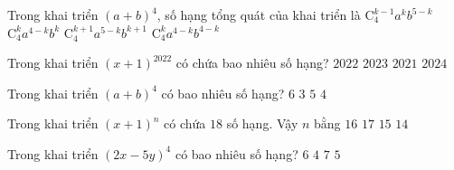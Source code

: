 

\begin{ex}%
	Trong khai triển $(a+b)^4$, số hạng tổng quát  của khai triển là
	\choice 
		 {$\mathrm{C}_{4}^{k-1} a^k b^{5-k}$}
		{\True $\mathrm{C}_{4}^k a^{4-k} b^k$} 
		{$\mathrm{C}_{4}^{k+1}  a^{5-k} b^{k+1}$}
		{$\mathrm{C}_{4}^k a^{4-k}  b^{4-k}$}
\end{ex}

\begin{ex}%
	Trong khai triển $(x+1)^{2022}$  có chứa bao nhiêu số hạng?
	\choice 
		 {$2022$}
		{\True  $2023$}
		 {$2021$}
		{$2024$} 
\end{ex}

\begin{ex}%
	Trong khai triển  $(a+b)^4$ có bao nhiêu số hạng?
	 \choice
		 {$6$}
		{$3$} 
		 {\True $5$}
		{$4$} 
\end{ex}

\begin{ex}%
	Trong khai triển $(x+1)^n$ có chứa $18$ số  hạng. Vậy $n$ bằng
	\choice 
		 {$16$}
		 {\True $17$}
		 {$15$}
		 {$14$}
\end{ex}

\begin{ex}%
	Trong khai triển $(2x - 5y)^4$ có bao  nhiêu số hạng?
	 \choice
		 {$6$}
		{$4$} 
		 {$7$}
		{\True  $5$}
\end{ex}

